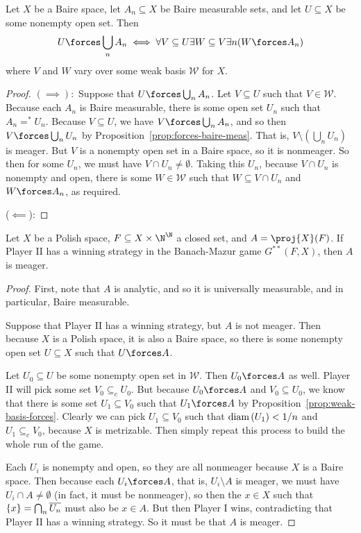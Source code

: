 \documentclass[10pt]{article}
\begin{document}
\begin{proposition}\label{prop:weak-basis-forces}
    Let $X$ be a Baire space, let $A_n \subseteq X$ be Baire measurable sets, and let $U \subseteq X$ be some nonempty open set.
    Then
    \[
        U \forces \bigcup_n A_n \iff \forall V \subseteq U \exists W \subseteq V \exists n (W \forces A_n)
    \]
    where $V$ and $W$ vary over some weak basis $\mathcal{W}$ for $X$.
\end{proposition}
\begin{proof}
    $(\implies):$ Suppose that $U \forces \bigcup_n A_n$.
    Let $V \subseteq U$ such that $V \in \mathcal{W}$.
    Because each $A_n$ is Baire measurable, there is some open set $U_n$ such that $A_n =^* U_n$.
    Because $V \subseteq U$, we have $V \forces \bigcup_n A_n$, and so then $V \forces \bigcup_n U_n$ by Proposition~\ref{prop:forces-baire-meas}.
    That is, $V \setminus (\bigcup_n U_n)$ is meager.
    But $V$ is a nonempty open set in a Baire space, so it is nonmeager.
    So then for some $U_n$, we must have $V \cap U_n \neq \emptyset$.
    Taking this $U_n$, because $V \cap U_n$ is nonempty and open, there is some $W \in \mathcal{W}$ such that $W \subseteq V \cap U_n$ and $W \forces A_n$, as required.

    ($\impliedby$): 
\end{proof}

\begin{proposition}[Exercise 79]
    Let $X$ be a Polish space, $F \subseteq X \times \N^{\N}$ a closed set, and $A = \proj{X}(F)$.
        If Player II has a winning strategy in the Banach-Mazur game $G^{**}(F,X)$, then $A$ is meager.
\end{proposition}
\begin{proof}
    First, note that $A$ is analytic, and so it is universally measurable, and in particular, Baire measurable.

    Suppose that Player II has a winning strategy, but $A$ is not meager.
    Then because $X$ is a Polish space, it is also a Baire space, so there is some nonempty open set $U \subseteq X$ such that $U \forces A$.

    Let $U_0 \subseteq U$ be some nonempty open set in $\mathcal{W}$.
    Then $U_0 \forces A$ as well.
    Player II will pick some set $V_0 \subseteq_c U_0$.
    But because $U_0 \forces A$ and $V_0 \subseteq U_0$, we know that there is some set $U_1 \subseteq V_0$ such that $U_1 \forces A$ by Proposition~\ref{prop:weak-basis-forces}.
    Clearly we can pick $U_1 \subseteq V_0$ such that $\text{diam} \left( U_1 \right) < 1/n$ and $U_1 \subseteq_c V_0$, because $X$ is metrizable.
    Then simply repeat this process to build the whole run of the game.

    Each $U_i$ is nonempty and open, so they are all nonmeager because $X$ is a Baire space.
    Then because each $U_i \forces A$, that is, $U_i \setminus A$ is meager, we must have $U_i \cap A \neq \emptyset$ (in fact, it must be nonmeager), so then the $x \in X$ such that ${\left\{ {x} \right\}} = \bigcap_n \overline{U_n}$ must also be $x \in A$.
    But then Player I wins, contradicting that Player II has a winning strategy.
    So it must be that $A$ is meager.
\end{proof}
\end{document}
